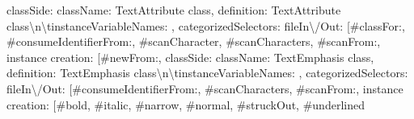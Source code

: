 {\textquotedbl{}classSide\textquotedbl{}: \textbraceleft \textquotedbl{}className\textquotedbl{}: \textquotedbl{}TextAttribute class\textquotedbl{}, \textquotedbl{}definition\textquotedbl{}: \textquotedbl{}TextAttribute class\allowbreak\textbackslash n\allowbreak\textbackslash tinstanceVariableNames: \textquotesingle{}\textquotesingle{}\textquotedbl{}, \textquotedbl{}categorizedSelectors\textquotedbl{}: \textbraceleft \textquotedbl{}fileIn\allowbreak\textbackslash /Out\textquotedbl{}: {[}\textquotedbl{}\#classFor:\textquotedbl{}, \textquotedbl{}\#consumeIdentifierFrom:\textquotedbl{}, \textquotedbl{}\#scanCharacter\textquotedbl{}, \textquotedbl{}\#scanCharacters\textquotedbl{}, \textquotedbl{}\#scanFrom:\textquotedbl{}{]}, \textquotedbl{}instance creation\textquotedbl{}: {[}\textquotedbl{}\#newFrom:\textquotedbl{}{]}\textbraceright \textbraceright \textbraceright , \textquotedbl{}classSide\textquotedbl{}: \textbraceleft \textquotedbl{}className\textquotedbl{}: \textquotedbl{}TextEmphasis class\textquotedbl{}, \textquotedbl{}definition\textquotedbl{}: \textquotedbl{}TextEmphasis class\allowbreak\textbackslash n\allowbreak\textbackslash tinstanceVariableNames: \textquotesingle{}\textquotesingle{}\textquotedbl{}, \textquotedbl{}categorizedSelectors\textquotedbl{}: \textbraceleft \textquotedbl{}fileIn\allowbreak\textbackslash /Out\textquotedbl{}: {[}\textquotedbl{}\#consumeIdentifierFrom:\textquotedbl{}, \textquotedbl{}\#scanCharacters\textquotedbl{}, \textquotedbl{}\#scanFrom:\textquotedbl{}{]}, \textquotedbl{}instance creation\textquotedbl{}: {[}\textquotedbl{}\#bold\textquotedbl{}, \textquotedbl{}\#italic\textquotedbl{}, \textquotedbl{}\#narrow\textquotedbl{}, \textquotedbl{}\#normal\textquotedbl{}, \textquotedbl{}\#struckOut\textquotedbl{}, \textquotedbl{}\#underlined\textquotedbl{}{]}\textbraceright \textbraceright \textbraceright \\
~\\
}
